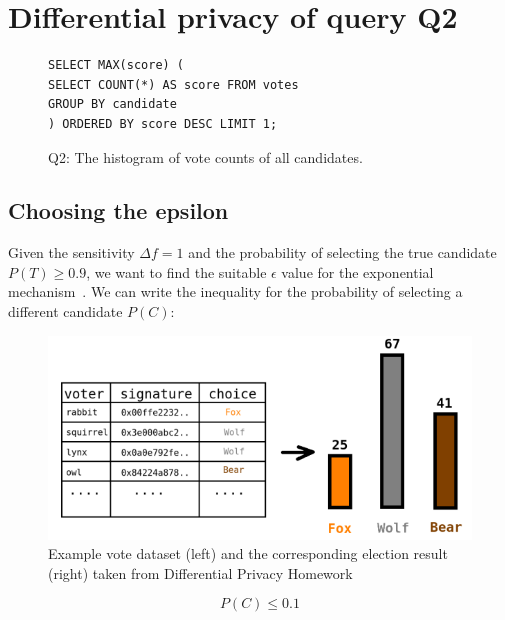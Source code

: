 

\newpage


\section{Differential privacy of query Q2}

\begin{figure}[ht]
  \begin{lstlisting}
SELECT MAX(score) (
SELECT COUNT(*) AS score FROM votes
GROUP BY candidate
) ORDERED BY score DESC LIMIT 1;
  \end{lstlisting}
  \caption{Q2: The histogram of vote counts of all candidates.}
  \label{fig:histogramQ2}
\end{figure}

\subsection{Choosing the epsilon}

Given the sensitivity $\Delta f = 1$ and the probability
of selecting the true candidate $P(T) \geq 0.9$, we want to
find the suitable $\epsilon$ value for the exponential mechanism~\cite[]{the_exponential}.
We can write the inequality for the probability of selecting a different candidate $P(C)$:

\begin{figure}[ht]
  \smaller
  \centering
  \includegraphics[width=\textwidth, keepaspectratio]{assets/fig1}
  \caption{Example vote dataset (left) and the corresponding election result (right) taken from Differential Privacy Homework}
  \label{fig:my_label5}
\end{figure}

\begin{equation}
  P(C) \leq 0.1
\end{equation}

